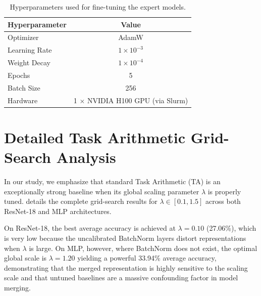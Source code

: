 \documentclass{article}
\begin{document}
\begin{table}[h]
\caption{Hyperparameters used for fine-tuning the expert models.}
\label{tab:hyperparams}
\begin{center}
\begin{tabular}{lc}
\toprule
Hyperparameter & Value \\
\midrule
Optimizer & AdamW \\
Learning Rate & $1 \times 10^{-3}$ \\
Weight Decay & $1 \times 10^{-4}$ \\
Epochs & 5 \\
Batch Size & 256 \\
Hardware & 1 $\times$ NVIDIA H100 GPU (via Slurm) \\
\bottomrule
\end{tabular}
\end{center}
\end{table}

\section{Detailed Task Arithmetic Grid-Search Analysis}
\label{app:gridsearch}

In our study, we emphasize that standard Task Arithmetic (TA) is an exceptionally strong baseline when its global scaling parameter $\lambda$ is properly tuned.  details the complete grid-search results for $\lambda \in [0.1, 1.5]$ across both ResNet-18 and MLP architectures. 

On ResNet-18, the best average accuracy is achieved at $\lambda = 0.10$ (27.06\%), which is very low because the uncalibrated BatchNorm layers distort representations when $\lambda$ is large. On MLP, however, where BatchNorm does not exist, the optimal global scale is $\lambda = 1.20$ yielding a powerful 33.94\% average accuracy, demonstrating that the merged representation is highly sensitive to the scaling scale and that untuned baselines are a massive confounding factor in model merging.
\end{document}
